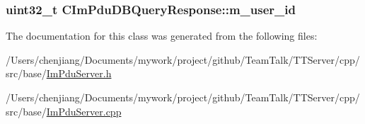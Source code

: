 \subsubsection[{m\+\_\+user\+\_\+id}]{\setlength{\rightskip}{0pt plus 5cm}uint32\+\_\+t C\+Im\+Pdu\+D\+B\+Query\+Response\+::m\+\_\+user\+\_\+id\hspace{0.3cm}{\ttfamily [private]}}\label{class_c_im_pdu_d_b_query_response_a9acdc14230db8fe41608a8660db4f8a3}


The documentation for this class was generated from the following files\+:\begin{DoxyCompactItemize}
\item 
/\+Users/chenjiang/\+Documents/mywork/project/github/\+Team\+Talk/\+T\+T\+Server/cpp/src/base/\hyperlink{_im_pdu_server_8h}{Im\+Pdu\+Server.\+h}\item 
/\+Users/chenjiang/\+Documents/mywork/project/github/\+Team\+Talk/\+T\+T\+Server/cpp/src/base/\hyperlink{_im_pdu_server_8cpp}{Im\+Pdu\+Server.\+cpp}\end{DoxyCompactItemize}
